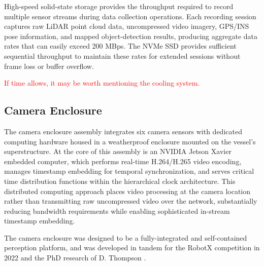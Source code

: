\documentclass{erauthesis}
\begin{document}
High-speed solid-state storage provides the throughput required to record multiple sensor streams during data collection operations.
Each recording session captures raw \ac{LiDAR} point cloud data, uncompressed video imagery, GPS/INS pose information, and mapped object-detection results, producing aggregate data rates that can easily exceed 200 \ac{MBps}.
The NVMe SSD provides sufficient sequential throughput to maintain these rates for extended sessions without frame loss or buffer overflow.

\textcolor{red}{If time allows, it may be worth mentioning the cooling system.}

\subsection{Camera Enclosure} \label{comp:camera_enclosure}


The camera enclosure assembly integrates six camera sensors with dedicated computing hardware housed in a weatherproof enclosure mounted on the vessel's superstructure. At the core of this assembly is an NVIDIA Jetson Xavier embedded computer, which performs real-time H.264/H.265 video encoding, manages timestamp embedding for temporal synchronization, and serves critical time distribution functions within the hierarchical clock architecture. This distributed computing approach places video processing at the camera location rather than transmitting raw uncompressed video over the network, substantially reducing bandwidth requirements while enabling sophisticated in-stream timestamp embedding.

The camera enclosure was designed to be a fully-integrated and self-contained perception platform, and was developed in tandem for the RobotX competition in 2022 and the PhD research of D. Thompson \cite{thompson2023}.
\end{document}
